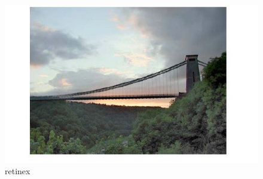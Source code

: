     \begin{figure}[!htb]
      	\includegraphics[width=\linewidth]{images/retinex1}
      	\caption{retinex}\label{fig:logtonemap}
      	\endminipage\hfill
      \end{figure}

